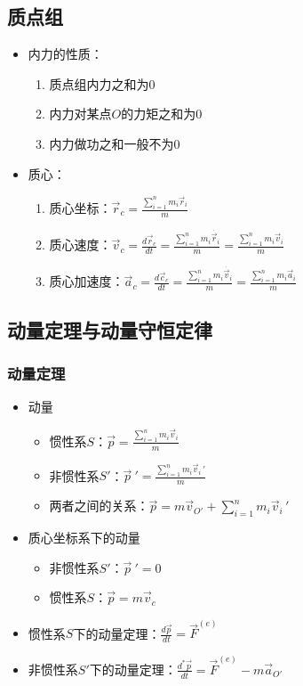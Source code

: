 \documentclass[UTF-8]{ctexart}
\begin{document}
\subsection{质点组}
\begin{itemize}

    \item 内力的性质：
          \begin{enumerate}
              \item 质点组内力之和为0
              \item 内力对某点$O$的力矩之和为0
              \item 内力做功之和一般不为0
          \end{enumerate}
    \item 质心：
          \begin{enumerate}
              \item 质心坐标：$ \vec{r}_c=\frac{ \sum\limits_{i=1}^nm_i\vec{r}_i}{m} $
              \item 质心速度：$\vec{v}_c=\frac{d\vec{r}_c}{dt}=\frac{ \sum\limits_{i=1}^n m_i\dot{\vec{r}_i}}{m}=\frac{ \sum\limits_{i=1}^n m_i\vec{v}_i}{m}$
              \item 质心加速度：$\vec{a}_c=\frac{d\vec{c}_c}{dt}=\frac{ \sum\limits_{i=1}^n m_i\dot{\vec{v}_i}}{m}=\frac{ \sum\limits_{i=1}^n m_i\vec{a}_i}{m}$
          \end{enumerate}
\end{itemize}
\subsection{动量定理与动量守恒定律}
\subsubsection{动量定理}
\begin{itemize}
    \item 动量
          \begin{itemize}
              \item 惯性系$S$：$\vec{p}=\frac{ \sum\limits_{i=1}^n m_i\vec{v}_i}{m}$
              \item 非惯性系$S'$：${\vec{p}}\ ' =\frac{ \sum\limits_{i=1}^n m_i{\vec{v}_i}\,'}{m}$
              \item 两者之间的关系：$\vec{p}=m\vec{v}_{O'}+\sum_{i=1}^n m_i {\vec{v}_i}\,'$
          \end{itemize}
    \item 质心坐标系下的动量
          \begin{itemize}
              \item 非惯性系$S'$：$\vec{p}\ '=0$
              \item 惯性系$S$：$\vec{p}=m\vec{v}_c$
          \end{itemize}
    \item 惯性系$S$下的动量定理：$ \frac{d\vec{p}}{dt}=\vec{F}^{(e)} $
    \item 非惯性系$S'$下的动量定理：$\frac{d^*\vec{p}}{dt}=\vec{F}^{(e)}-m\vec{a}_{O'}$
\end{itemize}
\end{document}
